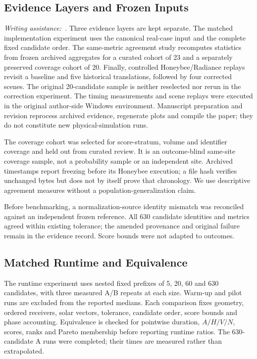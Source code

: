 \documentclass{llncs}
\newcommand{\aidraft}{\textit{Writing assistance:}~\cite{openai2026}. }
\begin{document}
\subsection{Evidence Layers and Frozen Inputs}
\aidraft{}Three evidence layers are kept separate. The matched implementation experiment uses the canonical real-case input and the complete fixed candidate order. The same-metric agreement study recomputes statistics from frozen archived aggregates for a curated cohort of 23 and a separately preserved coverage cohort of 20. Finally, controlled Honeybee/Radiance replays revisit a baseline and five historical translations, followed by four corrected scenes. The original 20-candidate sample is neither reselected nor rerun in the correction experiment. The timing measurements and scene replays were executed in the original author-side Windows environment. Manuscript preparation and revision reprocess archived evidence, regenerate plots and compile the paper; they do not constitute new physical-simulation runs.

The coverage cohort was selected for score-stratum, volume and identifier coverage and held out from curated review. It is an outcome-blind same-site coverage sample, not a probability sample or an independent site. Archived timestamps report freezing before its Honeybee execution; a file hash verifies unchanged bytes but does not by itself prove that chronology. We use descriptive agreement measures without a population-generalization claim.

Before benchmarking, a normalization-source identity mismatch was reconciled against an independent frozen reference. All 630 candidate identities and metrics agreed within existing tolerance; the amended provenance and original failure remain in the evidence record. Score bounds were not adapted to outcomes.

\subsection{Matched Runtime and Equivalence}
The runtime experiment uses nested fixed prefixes of 5, 20, 60 and 630 candidates, with three measured A/B repeats at each size. Warm-up and pilot runs are excluded from the reported medians. Each comparison fixes geometry, ordered receivers, solar vectors, tolerance, candidate order, score bounds and phase accounting. Equivalence is checked for pointwise duration, $A/H/V/N$, scores, ranks and Pareto membership before reporting runtime ratios. The 630-candidate A runs were completed; their times are measured rather than extrapolated.
\end{document}

